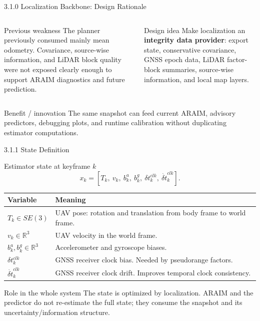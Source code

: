 \documentclass[10pt,aspectratio=169,xcolor=dvipsnames]{beamer}
\newcommand{\R}{\mathbb{R}}
\newcommand{\innov}[1]{\textcolor{NavyBlue}{\textbf{#1}}}
\begin{document}
\begin{frame}{3.1.0 Localization Backbone: Design Rationale}

  \small
  \begin{columns}[T]
    \begin{alertblock}{Previous weakness}
      \footnotesize
      The planner previously consumed mainly mean odometry. Covariance, source-wise information, and LiDAR block quality were not exposed clearly enough to support ARAIM diagnostics and future prediction.
    \end{alertblock}
    \begin{exampleblock}{Design idea}
      \footnotesize
      Make localization an \innov{integrity data provider}: export state, conservative covariance, GNSS epoch data, LiDAR factor-block summaries, source-wise information, and local map layers.
    \end{exampleblock}
  \end{columns}
  \begin{block}{Benefit / innovation}
    \footnotesize The same snapshot can feed current ARAIM, advisory predictors, debugging plots, and runtime calibration without duplicating estimator computations.
  \end{block}

\end{frame}

\begin{frame}{3.1.1 State Definition}
  \small
  \begin{block}{Estimator state at keyframe $k$}
    \[
      x_k=\left[T_k,\ v_k,\ b^a_k,\ b^g_k,\ \delta t^{clk}_k,\ \dot{\delta t}^{clk}_k\right].
    \]
  \end{block}

  \begin{table}\scriptsize
    \begin{tabular}{p{} p{}}
      \toprule
      \textbf{Variable} & \textbf{Meaning}\\
      \midrule
      $T_k\in SE(3)$ & UAV pose: rotation and translation from body frame to world frame.\\
      $v_k\in\R^3$ & UAV velocity in the world frame.\\
      $b^a_k,b^g_k\in\R^3$ & Accelerometer and gyroscope biases.\\
      $\delta t^{clk}_k$ & GNSS receiver clock bias. Needed by pseudorange factors.\\
      $\dot{\delta t}^{clk}_k$ & GNSS receiver clock drift. Improves temporal clock consistency.\\
      \bottomrule
    \end{tabular}
  \end{table}

  \begin{block}{Role in the whole system}
    \footnotesize The state is optimized by localization. ARAIM and the predictor do not re-estimate the full state; they consume the snapshot and its uncertainty/information structure.
  \end{block}
\end{frame}
\end{document}
